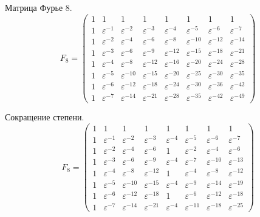 Матрица Фурье 8.
\[
    F_8
    = \begin{pmatrix}
        1 & 1                & 1                 & 1                 & 1                 & 1                 & 1                 & 1                 \\
        1 & \varepsilon^{-1} & \varepsilon^{-2}  & \varepsilon^{-3}  & \varepsilon^{-4}  & \varepsilon^{-5}  & \varepsilon^{-6}  & \varepsilon^{-7}  \\
        1 & \varepsilon^{-2} & \varepsilon^{-4}  & \varepsilon^{-6}  & \varepsilon^{-8}  & \varepsilon^{-10} & \varepsilon^{-12} & \varepsilon^{-14} \\
        1 & \varepsilon^{-3} & \varepsilon^{-6}  & \varepsilon^{-9}  & \varepsilon^{-12} & \varepsilon^{-15} & \varepsilon^{-18} & \varepsilon^{-21} \\
        1 & \varepsilon^{-4} & \varepsilon^{-8}  & \varepsilon^{-12} & \varepsilon^{-16} & \varepsilon^{-20} & \varepsilon^{-24} & \varepsilon^{-28} \\
        1 & \varepsilon^{-5} & \varepsilon^{-10} & \varepsilon^{-15} & \varepsilon^{-20} & \varepsilon^{-25} & \varepsilon^{-30} & \varepsilon^{-35} \\
        1 & \varepsilon^{-6} & \varepsilon^{-12} & \varepsilon^{-18} & \varepsilon^{-24} & \varepsilon^{-30} & \varepsilon^{-36} & \varepsilon^{-42} \\
        1 & \varepsilon^{-7} & \varepsilon^{-14} & \varepsilon^{-21} & \varepsilon^{-28} & \varepsilon^{-35} & \varepsilon^{-42} & \varepsilon^{-49}
    \end{pmatrix}
\]

Сокращение степени.
\[
    F_8
    = \begin{pmatrix}
        1 & 1                & 1                 & 1                 & 1                & 1                 & 1                 & 1                 \\
        1 & \varepsilon^{-1} & \varepsilon^{-2}  & \varepsilon^{-3}  & \varepsilon^{-4} & \varepsilon^{-5}  & \varepsilon^{-6}  & \varepsilon^{-7}  \\
        1 & \varepsilon^{-2} & \varepsilon^{-4}  & \varepsilon^{-6}  & 1                & \varepsilon^{-2}  & \varepsilon^{-4}  & \varepsilon^{-6}  \\
        1 & \varepsilon^{-3} & \varepsilon^{-6}  & \varepsilon^{-9}  & \varepsilon^{-4} & \varepsilon^{-7}  & \varepsilon^{-10} & \varepsilon^{-13} \\
        1 & \varepsilon^{-4} & \varepsilon^{-8}  & \varepsilon^{-12} & 1                & \varepsilon^{-4}  & \varepsilon^{-8}  & \varepsilon^{-12} \\
        1 & \varepsilon^{-5} & \varepsilon^{-10} & \varepsilon^{-15} & \varepsilon^{-4} & \varepsilon^{-9}  & \varepsilon^{-14} & \varepsilon^{-19} \\
        1 & \varepsilon^{-6} & \varepsilon^{-12} & \varepsilon^{-18} & 1                & \varepsilon^{-6}  & \varepsilon^{-12} & \varepsilon^{-18} \\
        1 & \varepsilon^{-7} & \varepsilon^{-14} & \varepsilon^{-21} & \varepsilon^{-4} & \varepsilon^{-11} & \varepsilon^{-18} & \varepsilon^{-25}
    \end{pmatrix}
\]

